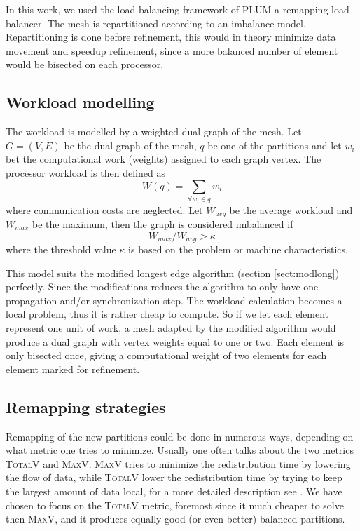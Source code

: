 In this work, we used the load balancing framework of PLUM
\cite{Oli1998a} a remapping load balancer. The mesh is repartitioned
according to an imbalance model. Repartitioning is done before
refinement, this would in theory minimize data movement and speedup
refinement, since a more balanced number of element would be bisected
on each processor.

\subsection{Workload modelling}

The workload is modelled by a weighted dual graph of the mesh. Let
$G=(V,E)$ be the dual graph of the mesh, $q$ be one of the partitions
and let $w_i$ bet the computational work (weights) assigned to each
graph vertex. The processor workload is then defined as
\begin{equation}
  \label{eq:compwork}
  W(q) = \sum_{\forall w_i \in q} w_i
\end{equation}
where communication costs are neglected. Let $W_{avg}$ be the average workload and $W_{max}$ be the maximum, then the graph is considered imbalanced if 
\begin{equation}
  \label{eq:imbalancefactor}
  W_{max} /  W_{avg}  > \kappa
\end{equation}
where the threshold value $\kappa$ is based on the problem or machine characteristics. 

This model suits the modified longest edge algorithm (section
\ref{sect:modlong}) perfectly. Since the modifications reduces the
algorithm to only have one propagation and/or synchronization
step. The workload calculation becomes a local problem, thus it is
rather cheap to compute. So if we let each element represent one unit
of work, a mesh adapted by the modified algorithm would produce a dual
graph with vertex weights equal to one or two. Each element is only
bisected once, giving a computational weight of two elements for each
element marked for refinement.

\subsection{Remapping strategies}
\label{sect:intemap}

Remapping of the new partitions could be done in numerous ways,
depending on what metric one tries to minimize. Usually one often
talks about the two metrics \textsc{TotalV} and
\textsc{MaxV}. \textsc{MaxV} tries to minimize the redistribution time
by lowering the flow of data, while \textsc{TotalV} lower the
redistribution time by trying to keep the largest amount of data
local, for a more detailed description see \cite{Oli1998a}. We have
chosen to focus on the \textsc{TotalV} metric, foremost since it much
cheaper to solve then \textsc{MaxV}, and it produces equally good (or
even better) balanced partitions.

